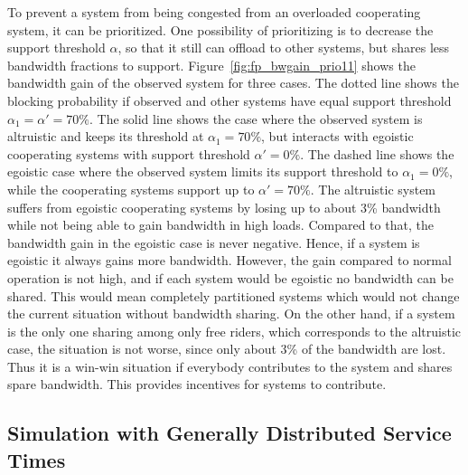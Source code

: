 To prevent a system from being congested from an overloaded cooperating system, it can be prioritized. One possibility of prioritizing is to decrease the support threshold $\alpha$, so that it still can offload to other systems, but shares less bandwidth fractions to support. Figure~\ref{fig:fp_bwgain_prio11} shows the bandwidth gain of the observed system for three cases. The dotted line shows the blocking probability if observed and other systems have equal support threshold $\alpha_1=\alpha'=70\%$. The solid line shows the case where the observed system is altruistic and keeps its threshold at $\alpha_1=70\%$, but interacts with egoistic cooperating systems with support threshold $\alpha'=0\%$. The dashed line shows the egoistic case where the observed system limits its support threshold to $\alpha_1=0\%$, while the cooperating systems support up to $\alpha'=70\%$. The altruistic system suffers from egoistic cooperating systems by losing up to about 3\% bandwidth while not being able to gain bandwidth in high loads. Compared to that, the bandwidth gain in the egoistic case is never negative.
Hence, if a system is egoistic it always gains more bandwidth. However, the gain compared to normal operation is not high, and if each system would be egoistic no bandwidth can be shared. This would mean completely partitioned systems which would not change the current situation without bandwidth sharing.
On the other hand, if a system is the only one sharing among only free riders, which corresponds to the altruistic case, the situation is not worse, since only about 3\% of the bandwidth are lost.
Thus it is a win-win situation if everybody contributes to the system and shares spare bandwidth.
This provides incentives for systems to contribute.

\subsection{Simulation with Generally Distributed Service Times}\label{sec:simgeneral}

